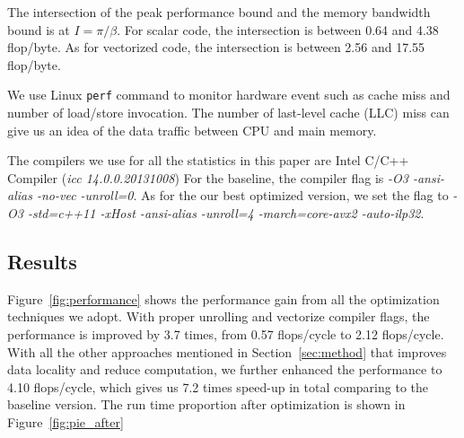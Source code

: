 The intersection of the peak performance bound and the memory bandwidth bound is at $I = \pi/\beta$. For scalar code, the intersection is between 0.64 and 4.38 flop/byte. As for vectorized code, the intersection is between 2.56 and 17.55 flop/byte.

We use Linux \texttt{perf} command \cite{perf} to monitor hardware event such as cache miss and number of load/store invocation. The number of last-level cache (LLC) miss can give us an idea of the data traffic between CPU and main memory.


The compilers we use for all the statistics in this paper are Intel C/C++ Compiler (\textit{icc 14.0.0.20131008}) For the baseline, the compiler flag is \textit{-O3 -ansi-alias -no-vec -unroll=0}. As for the our best optimized version, we set the flag to \textit{-O3 -std=c++11 -xHost -ansi-alias -unroll=4 -march=core-avx2 -auto-ilp32}.




\subsection{Results}

Figure~\ref{fig:performance} shows the performance gain from all the optimization techniques we adopt. With proper unrolling and vectorize compiler flags, the performance is improved by 3.7 times, from 0.57 flops/cycle to 2.12 flops/cycle. With all the other approaches mentioned in Section~\ref{sec:method} that improves data locality and reduce computation, we further enhanced the performance to 4.10 flops/cycle, which gives us 7.2 times speed-up in total comparing to the baseline version. The run time proportion after optimization is shown in Figure~\ref{fig:pie_after} 


